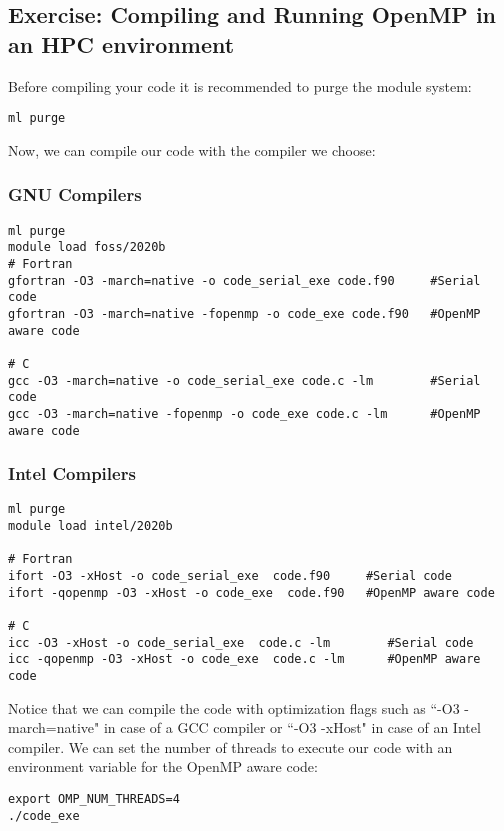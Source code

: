 \subsection{Exercise: Compiling and Running OpenMP in an HPC environment }

Before compiling your code it is recommended to purge the module system:

\begin{verbatim}
ml purge
\end{verbatim}

Now, we can compile our code with the compiler we choose:

\subsubsection{GNU Compilers}

\begin{verbatim}
ml purge
module load foss/2020b
# Fortran
gfortran -O3 -march=native -o code_serial_exe code.f90     #Serial code
gfortran -O3 -march=native -fopenmp -o code_exe code.f90   #OpenMP aware code

# C
gcc -O3 -march=native -o code_serial_exe code.c -lm        #Serial code
gcc -O3 -march=native -fopenmp -o code_exe code.c -lm      #OpenMP aware code
\end{verbatim}

\subsubsection{Intel Compilers}

\begin{verbatim}
ml purge
module load intel/2020b

# Fortran
ifort -O3 -xHost -o code_serial_exe  code.f90     #Serial code
ifort -qopenmp -O3 -xHost -o code_exe  code.f90   #OpenMP aware code

# C
icc -O3 -xHost -o code_serial_exe  code.c -lm        #Serial code
icc -qopenmp -O3 -xHost -o code_exe  code.c -lm      #OpenMP aware code
\end{verbatim}

Notice that we can compile the code with optimization flags such as ``-O3 -march=native" in case of a GCC compiler or  ``-O3 -xHost" in case of an Intel compiler. 
We can set the number of threads to  execute our code with an environment variable
for the OpenMP aware code:

\begin{verbatim}
export OMP_NUM_THREADS=4
./code_exe
\end{verbatim}

